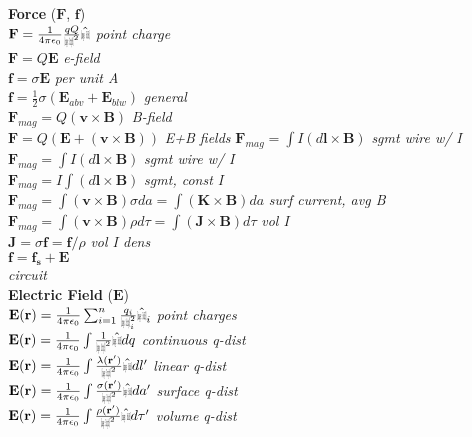 \documentclass[9pt]{extarticle}
\def\rcurs{{\mbox{$\resizebox{.09in}{.08in}{\texttt{[image: ScriptR]}}$}}}
\def\brcurs{{\mbox{$\resizebox{.09in}{.08in}{\texttt{[image: BoldR]}}$}}}
\begin{document}
\begin{multicols}{3}
\textbf{Force} ($\mathbf{F}$, $\mathbf{f}$) \\
$\mathbf{F} = \frac{1}{4\pi\epsilon_{0}}\frac{qQ}{\rcurs^{2}}\hat{\brcurs}$  \textit{point charge} \\
$\mathbf{F} = Q\mathbf{E}$ \textit{e-field} \\
$\mathbf{f} = \sigma\mathbf{E}$ \textit {per unit A} \\
$\mathbf{f} = \frac{1}{2}\sigma(\mathbf{E}_{abv} + \mathbf{E}_{blw})$ \textit{general} \\
$\mathbf{F}_{mag} = Q(\mathbf{v}\times\mathbf{B})$ \textit{B-field} \\
$\mathbf{F} = Q(\mathbf{E} + (\mathbf{v}\times\mathbf{B}))$ \textit{E+B fields}
$\mathbf{F}_{mag} = \int I(d\mathbf{l}\times\mathbf{B})$ \textit{sgmt wire w/ I} \\
$\mathbf{F}_{mag} = \int I(d\mathbf{l}\times\mathbf{B})$ \textit{sgmt wire w/ I} \\
$\mathbf{F}_{mag} = I \int (d\mathbf{l}\times\mathbf{B})$ \textit{sgmt, const I} \\
$\mathbf{F}_{mag} = \int (\mathbf{v}\times\mathbf{B})\sigma da = \int (\mathbf{K}\times\mathbf{B})da$ \textit{surf current, avg B} \\
$\mathbf{F}_{mag} = \int (\mathbf{v}\times\mathbf{B})\rho d\tau = \int (\mathbf{J}\times\mathbf{B})d\tau$ \textit{vol I} \\
$\mathbf{J} = \sigma\mathbf{f}=\mathbf{f}/\rho$ \textit{vol I dens} \\
$\mathbf{f} = \mathbf{f_{s}} + \mathbf{E}$ \\ \textit{circuit} \\
\textbf{Electric Field} ($\mathbf{E}$) \\
$\mathbf{E}(\mathbf{r}) = \frac{1}{4\pi\epsilon_{0}}\sum_{i=1}^{n}\frac{q_{i}}{\rcurs_{i}^{2}}\hat{\brcurs}_{i}$ \textit{point charges} \\
$\mathbf{E}(\mathbf{r}) = \frac{1}{4\pi\epsilon_{0}}\int \frac{1}{\rcurs^{2}}\hat{\brcurs} dq$ \textit{continuous q-dist} \\
$\mathbf{E}(\mathbf{r}) = \frac{1}{4\pi\epsilon_{0}}\int \frac{\lambda(\mathbf{r}')}{\rcurs^{2}}\hat{\brcurs} dl'$ \textit{linear q-dist} \\
$\mathbf{E}(\mathbf{r}) = \frac{1}{4\pi\epsilon_{0}}\int \frac{\sigma(\mathbf{r}')}{\rcurs^{2}}\hat{\brcurs} da'$ \textit{surface q-dist} \\
$\mathbf{E}(\mathbf{r}) = \frac{1}{4\pi\epsilon_{0}}\int \frac{\rho(\mathbf{r}')}{\rcurs^{2}}\hat{\brcurs} d\tau'$ \textit{volume q-dist} \\

\end{multicols}
\end{document}
